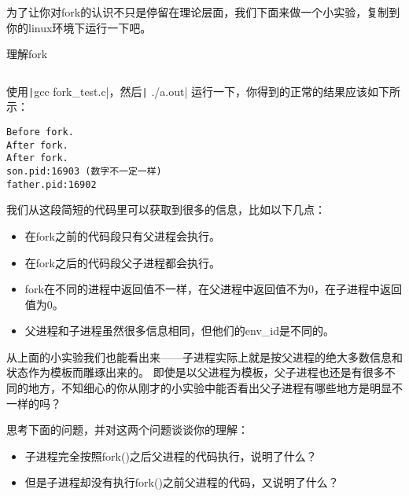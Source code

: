 为了让你对fork的认识不只是停留在理论层面，我们下面来做一个小实验，复制到你的linux环境下运行一下吧。
\begin{codeBoxWithCaption}{理解fork\label{code:fork_test.c}}
  \inputminted[linenos]{c}{codes/fork_test.c}
\end{codeBoxWithCaption}

使用\texttt|gcc fork_test.c|，然后\texttt| ./a.out| 运行一下，你得到的正常的结果应该如下所示：
\begin{verbatim}
Before fork.
After fork.
After fork.
son.pid:16903 (数字不一定一样)
father.pid:16902
\end{verbatim}

我们从这段简短的代码里可以获取到很多的信息，比如以下几点：
\begin{itemize}
 \item 在fork之前的代码段只有父进程会执行。
 \item 在fork之后的代码段父子进程都会执行\label{fork与子进程}。
 \item fork在不同的进程中返回值不一样，在父进程中返回值不为0，在子进程中返回值为0。
 \item 父进程和子进程虽然很多信息相同，但他们的env\_id是不同的。
\end{itemize}

从上面的小实验我们也能看出来——子进程实际上就是按父进程的绝大多数信息和状态作为模板而雕琢出来的。
即使是以父进程为模板，父子进程也还是有很多不同的地方，不知细心的你从刚才的小实验中能否看出父子进程有哪些地方是明显不一样的吗？

\begin{thinking}\label{think-father-son}
 思考下面的问题，并对这两个问题谈谈你的理解：
  \begin{itemize}
   \item 子进程完全按照fork()之后父进程的代码执行，说明了什么？
   \item 但是子进程却没有执行fork()之前父进程的代码，又说明了什么？
  \end{itemize}
\end{thinking}



